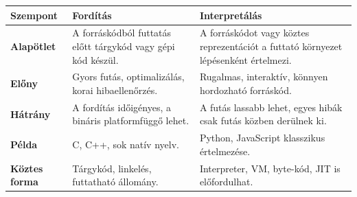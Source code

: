 \begin{tabularx}{\textwidth}{>{\bfseries}lXX}
Szempont & Fordítás & Interpretálás \\
\midrule
Alapötlet & A forráskódból futtatás előtt tárgykód vagy gépi kód készül. & A forráskódot vagy köztes reprezentációt a futtató környezet lépésenként értelmezi. \\
Előny & Gyors futás, optimalizálás, korai hibaellenőrzés. & Rugalmas, interaktív, könnyen hordozható forráskód. \\
Hátrány & A fordítás időigényes, a bináris platformfüggő lehet. & A futás lassabb lehet, egyes hibák csak futás közben derülnek ki. \\
Példa & C, C++, sok natív nyelv. & Python, JavaScript klasszikus értelmezése. \\
Köztes forma & Tárgykód, linkelés, futtatható állomány. & Interpreter, VM, byte-kód, JIT is előfordulhat. \\
\end{tabularx}

